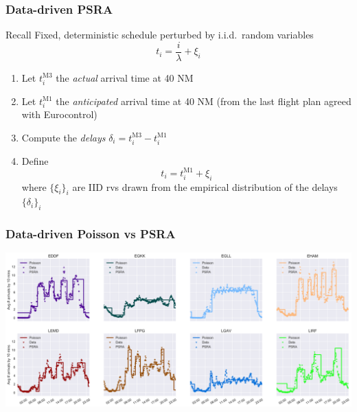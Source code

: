 \documentclass[table,aspectratio=169]{beamer}
\begin{document}
\begin{frame}[t]\frametitle{Data-driven PSRA}
    \begin{alertblock}{Recall}
        Fixed, deterministic schedule perturbed by i.i.d.\ random variables
        \[ t_i = \frac{i}{\lambda} + \xi_i \]
    \end{alertblock}
    \begin{enumerate}
        \item Let $t^{\mathrm{M3}}_i$ the \alert{\emph{actual} arrival} time at 40 NM
        \item Let $t^{\mathrm{M1}}_i$ the \alert{\emph{anticipated} arrival} time at 40 NM (from the last flight plan agreed with Eurocontrol)
        \item Compute the \emph{delays} $\delta_i = t^{\mathrm{M3}}_i - t^{\mathrm{M1}}_i$
        \item Define
        \[t_i = t^{\mathrm{M1}}_i + \xi_i\]
        where $\{\xi_i\}_i$ are IID rvs drawn from the empirical distribution of the delays $\{\delta_i\}_i$
    \end{enumerate}
\end{frame}

\begin{frame}[t]\frametitle{Data-driven Poisson vs PSRA}
    \centering
    \includegraphics[width=.9\textwidth]{mean_simul_arrivals}
\end{frame}
\end{document}
